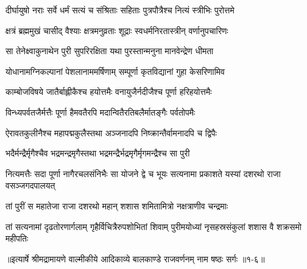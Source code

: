 \twolineshloka
{दीर्घायुषो नराः सर्वे धर्मं सत्यं च संश्रिताः}
{सहिताः पुत्रपौत्रैश्च नित्यं स्त्रीभिः पुरोत्तमे} %

\twolineshloka
{क्षत्रं ब्रह्ममुखं चासीद् वैश्याः क्षत्रमनुव्रताः}
{शूद्राः स्वधर्मनिरतास्त्रीन् वर्णानुपचारिणः} %

\twolineshloka
{सा तेनेक्ष्वाकुनाथेन पुरी सुपरिरक्षिता}
{यथा पुरस्तान्मनुना मानवेन्द्रेण धीमता} %

\twolineshloka
{योधानामग्निकल्पानां पेशलानाममर्षिणाम्}
{सम्पूर्णा कृतविद्यानां गुहा केसरिणामिव} %

\twolineshloka
{काम्बोजविषये जातैर्बाह्लीकैश्च हयोत्तमैः}
{वनायुजैर्नदीजैश्च पूर्णा हरिहयोत्तमैः} %

\twolineshloka
{विन्ध्यपर्वतजैर्मत्तैः पूर्णा हैमवतैरपि}
{मदान्वितैरतिबलैर्मातङ्गैः पर्वतोपमैः} %

\twolineshloka
{ऐरावतकुलीनैश्च महापद्मकुलैस्तथा}
{अञ्जनादपि निष्क्रान्तैर्वामनादपि च द्विपैः} %

\twolineshloka
{भदैर्मन्द्रैर्मृगैश्चैव भद्रमन्द्रमृगैस्तथा}
{भद्रमन्द्रैर्भद्रमृगैर्मृगमन्द्रैश्च सा पुरी} %

\threelineshloka
{नित्यमत्तैः सदा पूर्णा नागैरचलसंनिभैः}
{सा योजने द्वे च भूयः सत्यनामा प्रकाशते}
{यस्यां दशरथो राजा वसञ्जगदपालयत्} %

\twolineshloka
{तां पुरीं स महातेजा राजा दशरथो महान्}
{शशास शमितामित्रो नक्षत्राणीव चन्द्रमाः} %

\twolineshloka
{तां सत्यनामां दृढतोरणार्गलाम् गृहैर्विचित्रैरुपशोभितां शिवाम्}
{पुरीमयोध्यां नृसहस्रसंकुलां शशास वै शक्रसमो महीपतिः} %


॥इत्यार्षे श्रीमद्रामायणे वाल्मीकीये आदिकाव्ये बालकाण्डे राजवर्णनम् नाम षष्ठः सर्गः ॥१-६॥
